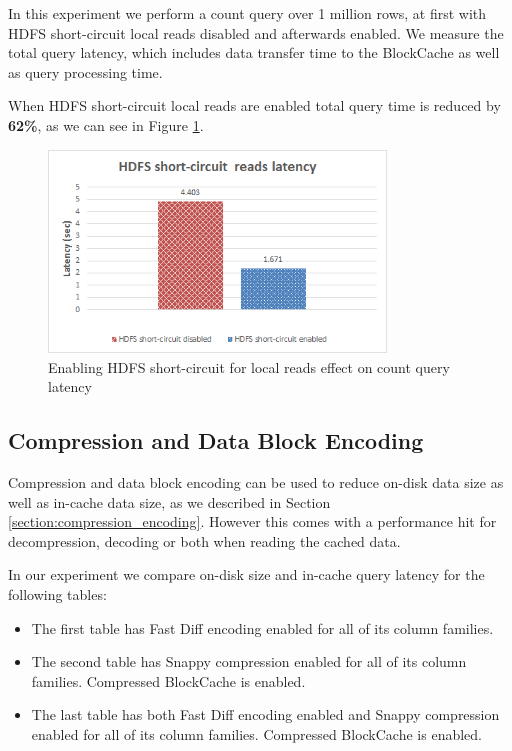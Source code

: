 In this experiment we perform a count query over 1 million rows, at first with HDFS short-circuit local reads disabled and afterwards enabled. We measure the total query latency, which includes data transfer time to the BlockCache as well as query processing time. 

When HDFS short-circuit local reads are enabled total query time is reduced by \textbf{62\%}, as we can see in Figure \ref{figure:benchmarks_hbase_short_circuit_latency}.

\begin{figure}[H]
\centering
\includegraphics[width=0.8\textwidth]{figures/benchmarks_hbase_short_circuit_latency}
\caption{Enabling HDFS short-circuit for local reads effect on count query latency}
\label{figure:benchmarks_hbase_short_circuit_latency}
\end{figure}

\subsection{Compression and Data Block Encoding}\label{subsection:benchmarks_compression_encoding}

Compression and data block encoding can be used to reduce on-disk data size as well as in-cache data size, as we described in Section \ref{section:compression_encoding}. However this comes with a performance hit for decompression, decoding or both when reading the cached data.

In our experiment we compare on-disk size and in-cache query latency for the following tables:
\begin{itemize}
\item The first table has Fast Diff encoding enabled for all of its column families.
\item The second table has Snappy compression enabled for all of its column families. Compressed BlockCache is enabled.
\item The last table has both Fast Diff encoding enabled and Snappy compression enabled for all of its column families. Compressed BlockCache is enabled.
\end{itemize}

